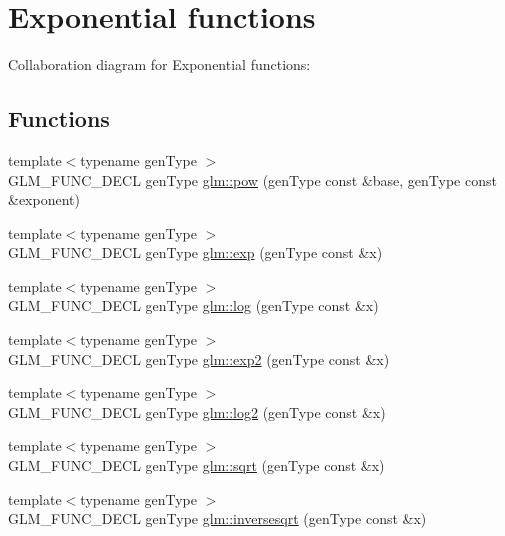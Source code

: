 \hypertarget{group__core__func__exponential}{}\section{Exponential functions}
\label{group__core__func__exponential}
Collaboration diagram for Exponential functions\+:
\subsection*{Functions}
\begin{DoxyCompactItemize}
\item 
{\footnotesize template$<$typename gen\+Type $>$ }\\G\+L\+M\+\_\+\+F\+U\+N\+C\+\_\+\+D\+E\+C\+L gen\+Type \hyperlink{group__core__func__exponential_ga1ce4b2fddd26d0d3a35a8d98f37f3ac0}{glm\+::pow} (gen\+Type const \&base, gen\+Type const \&exponent)
\item 
{\footnotesize template$<$typename gen\+Type $>$ }\\G\+L\+M\+\_\+\+F\+U\+N\+C\+\_\+\+D\+E\+C\+L gen\+Type \hyperlink{group__core__func__exponential_gae154699ba6bda068d4b87cf9b987381f}{glm\+::exp} (gen\+Type const \&x)
\item 
{\footnotesize template$<$typename gen\+Type $>$ }\\G\+L\+M\+\_\+\+F\+U\+N\+C\+\_\+\+D\+E\+C\+L gen\+Type \hyperlink{group__core__func__exponential_ga0c8da2d2921da250e8700ac4476916a1}{glm\+::log} (gen\+Type const \&x)
\item 
{\footnotesize template$<$typename gen\+Type $>$ }\\G\+L\+M\+\_\+\+F\+U\+N\+C\+\_\+\+D\+E\+C\+L gen\+Type \hyperlink{group__core__func__exponential_gac45997fb3ac907cad408d6da0a0f5f54}{glm\+::exp2} (gen\+Type const \&x)
\item 
{\footnotesize template$<$typename gen\+Type $>$ }\\G\+L\+M\+\_\+\+F\+U\+N\+C\+\_\+\+D\+E\+C\+L gen\+Type \hyperlink{group__core__func__exponential_gace633300a51ca1cbc1a42f565dcd3407}{glm\+::log2} (gen\+Type const \&x)
\item 
{\footnotesize template$<$typename gen\+Type $>$ }\\G\+L\+M\+\_\+\+F\+U\+N\+C\+\_\+\+D\+E\+C\+L gen\+Type \hyperlink{group__core__func__exponential_ga2317d4ff45af448b8402431afa0711f3}{glm\+::sqrt} (gen\+Type const \&x)
\item 
{\footnotesize template$<$typename gen\+Type $>$ }\\G\+L\+M\+\_\+\+F\+U\+N\+C\+\_\+\+D\+E\+C\+L gen\+Type \hyperlink{group__core__func__exponential_ga5ac08ead2e50ad0295b9ad85a3e449e9}{glm\+::inversesqrt} (gen\+Type const \&x)
\end{DoxyCompactItemize}


